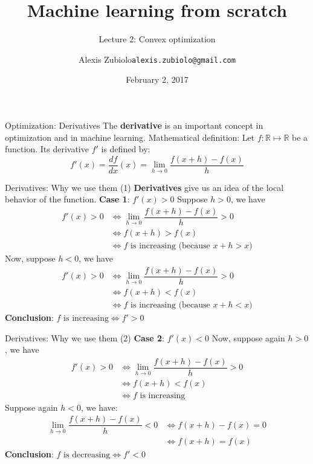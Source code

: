 \documentclass{beamer}
\title[Course presentation]{Machine learning from scratch}
\subtitle{Lecture 2: Convex optimization}
\author{Alexis Zubiolo\newline\texttt{alexis.zubiolo@gmail.com}}
\institute{Data Science Team Lead @ Adcash}
\date{February 2, 2017}
\newcommand{\real}{\mathbb{R}}
\newcommand{\1}[1]{\mathbbm{1}\left[#1\right]}
\begin{document}
\begin{frame}
  \titlepage
\end{frame}
\begin{frame}{Optimization: Derivatives}
The \textbf{derivative} is an important concept in optimization and in machine learning. Mathematical definition: Let $f : \real \mapsto \real$ be a function. Its derivative $f'$ is defined by:
\begin{equation*}
	f'(x) = \dfrac{df}{dx}(x) = \lim_{h \to 0}\dfrac{f(x + h) - f(x)}{h}
\end{equation*}
\end{frame}

\begin{frame}{Derivatives: Why we use them (1)}
\textbf{Derivatives} give us an idea of the local behavior of the function.
\vfill
\pause
\textbf{Case 1}: $f'(x) > 0$
\vfill
\pause
Suppose $h > 0$, we have
\begin{equation*}
\begin{split}
f'(x) > 0 & \iff \lim_{h \to 0}\dfrac{f(x + h) - f(x)}{h} > 0 \\
& \iff f(x + h) > f(x) \\
& \iff f \text{ is increasing (because } x + h > x \text{)}
\end{split}
\end{equation*}
\vfill
\pause
Now, suppose $h < 0$, we have
\vfill
\pause
\begin{equation*}
\begin{split}
f'(x) > 0 & \iff \lim_{h \to 0}\dfrac{f(x + h) - f(x)}{h} > 0 \\
& \iff f(x + h) < f(x) \\
& \iff f \text{ is increasing (because } x + h < x \text{)}
\end{split}
\end{equation*}
\vfill
\pause
\textbf{Conclusion}: $f \text{ is increasing} \iff f' > 0$
\end{frame}

\begin{frame}{Derivatives: Why we use them (2)}
\textbf{Case 2}: $f'(x) < 0$
\vfill
\pause
Now, suppose again $h > 0$, we have
\vfill
\pause
\begin{equation*}
\begin{split}
f'(x) > 0 & \iff \lim_{h \to 0}\dfrac{f(x + h) - f(x)}{h} > 0 \\
& \iff f(x + h) < f(x) \\
& \iff f \text{ is increasing}
\end{split}
\end{equation*}
\pause
\vfill
\pause
Suppose again $h < 0$, we have:
\vfill
\pause
\begin{equation*}
\begin{split}
\lim_{h \to 0}\dfrac{f(x + h) - f(x)}{h} < 0 & \iff f(x + h) - f(x) = 0 \\
 & \iff f(x + h) = f(x)
\end{split}
\end{equation*}
\vfill
\pause
\textbf{Conclusion}: $f \text{ is decreasing} \iff f' < 0$
\end{frame}
\end{document}
